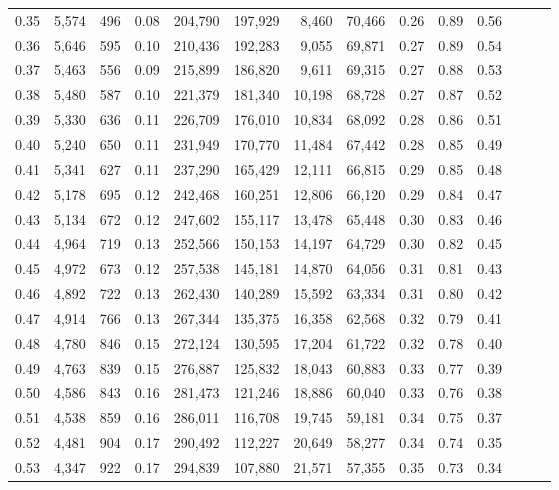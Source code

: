 \begin{tabular}{rrrrrrrrrrrrrr}
0.35 &  5,574 &    496 &  0.08 &  204,790 &  197,929 &   8,460 &  70,466 &  0.26 &  0.89 &      0.56 \\
0.36 &  5,646 &    595 &  0.10 &  210,436 &  192,283 &   9,055 &  69,871 &  0.27 &  0.89 &      0.54 \\
0.37 &  5,463 &    556 &  0.09 &  215,899 &  186,820 &   9,611 &  69,315 &  0.27 &  0.88 &      0.53 \\
0.38 &  5,480 &    587 &  0.10 &  221,379 &  181,340 &  10,198 &  68,728 &  0.27 &  0.87 &      0.52 \\
0.39 &  5,330 &    636 &  0.11 &  226,709 &  176,010 &  10,834 &  68,092 &  0.28 &  0.86 &      0.51 \\
0.40 &  5,240 &    650 &  0.11 &  231,949 &  170,770 &  11,484 &  67,442 &  0.28 &  0.85 &      0.49 \\
0.41 &  5,341 &    627 &  0.11 &  237,290 &  165,429 &  12,111 &  66,815 &  0.29 &  0.85 &      0.48 \\
0.42 &  5,178 &    695 &  0.12 &  242,468 &  160,251 &  12,806 &  66,120 &  0.29 &  0.84 &      0.47 \\
0.43 &  5,134 &    672 &  0.12 &  247,602 &  155,117 &  13,478 &  65,448 &  0.30 &  0.83 &      0.46 \\
0.44 &  4,964 &    719 &  0.13 &  252,566 &  150,153 &  14,197 &  64,729 &  0.30 &  0.82 &      0.45 \\
0.45 &  4,972 &    673 &  0.12 &  257,538 &  145,181 &  14,870 &  64,056 &  0.31 &  0.81 &      0.43 \\
0.46 &  4,892 &    722 &  0.13 &  262,430 &  140,289 &  15,592 &  63,334 &  0.31 &  0.80 &      0.42 \\
0.47 &  4,914 &    766 &  0.13 &  267,344 &  135,375 &  16,358 &  62,568 &  0.32 &  0.79 &      0.41 \\
0.48 &  4,780 &    846 &  0.15 &  272,124 &  130,595 &  17,204 &  61,722 &  0.32 &  0.78 &      0.40 \\
0.49 &  4,763 &    839 &  0.15 &  276,887 &  125,832 &  18,043 &  60,883 &  0.33 &  0.77 &      0.39 \\
0.50 &  4,586 &    843 &  0.16 &  281,473 &  121,246 &  18,886 &  60,040 &  0.33 &  0.76 &      0.38 \\
0.51 &  4,538 &    859 &  0.16 &  286,011 &  116,708 &  19,745 &  59,181 &  0.34 &  0.75 &      0.37 \\
0.52 &  4,481 &    904 &  0.17 &  290,492 &  112,227 &  20,649 &  58,277 &  0.34 &  0.74 &      0.35 \\
0.53 &  4,347 &    922 &  0.17 &  294,839 &  107,880 &  21,571 &  57,355 &  0.35 &  0.73 &      0.34 \\

\end{tabular}
